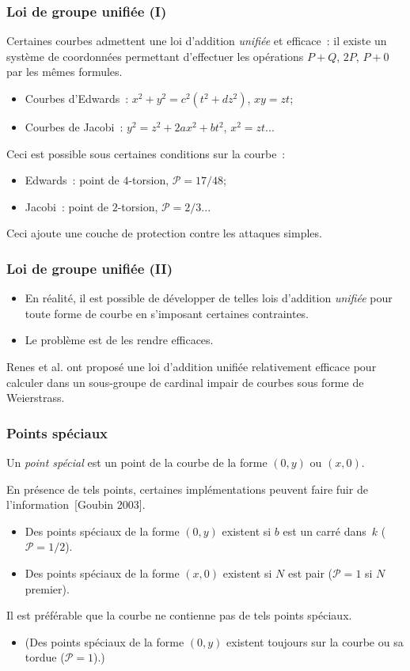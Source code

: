 \documentclass[francais]{beamer}
\newcommand{\prob}{\mathcal{P}}
\newcommand{\bib}[1]{{\usebeamercolor{emph}\textcolor{fg}{~[#1]}}}
\begin{document}
\begin{frame}\frametitle{Loi de groupe unifiée (I)}
Certaines courbes admettent une loi d'addition \emph{unifiée} et efficace :
il existe un système de coordonnées permettant d'effectuer
les opérations $P + Q$, $2 P$, $P + 0$ par les mêmes formules.
\begin{itemize}
\item Courbes d'Edwards : $x^2 + y^2 = c^2 (t^2 + d z^2)$, $xy = zt$;
\item Courbes de Jacobi : $y^2 = z^2 + 2 a x^2 + b t^2$, $x^2 = zt$...
\end{itemize}

Ceci est possible sous certaines conditions sur la courbe :
\begin{itemize}
\item Edwards : point de $4$-torsion, $\prob = 17/48$;
\item Jacobi : point de $2$-torsion, $\prob = 2/3$...
\end{itemize}

Ceci ajoute une couche de protection contre les attaques simples.
\end{frame}

\begin{frame}\frametitle{Loi de groupe unifiée (II)}
\begin{itemize}
\item En réalité, il est possible de développer de telles lois d'addition \emph{unifiée} pour toute forme de courbe en s'imposant certaines contraintes.
\item Le problème est de les rendre efficaces.
\end{itemize}
\begin{block}{}
Renes et al. ont proposé une loi d'addition unifiée relativement efficace
pour calculer dans un sous-groupe de cardinal impair
de courbes sous forme de Weierstrass.
\end{block}
\end{frame}

\begin{frame}\frametitle{Points spéciaux}
Un \emph{point spécial} est un point de la courbe
de la forme $(0, y)$ ou $(x, 0)$.

En présence de tels points, certaines implémentations
peuvent faire fuir de l'information\bib{Goubin 2003}.

\begin{itemize}
\item Des points spéciaux de la forme $(0, y)$ existent
si $b$ est un carré dans~$k$ ($\prob = 1/2$).
\item Des points spéciaux de la forme $(x, 0)$ existent
si $N$ est pair ($\prob = 1$ si $N$ premier).
\end{itemize}

\begin{block}{}
Il est préférable que la courbe ne contienne pas de tels points spéciaux.
\end{block}
\begin{itemize}
\item (Des points spéciaux de la forme $(0, y)$ existent toujours sur la courbe
ou sa tordue ($\prob = 1$).)
\end{itemize}
\end{frame}
\end{document}
